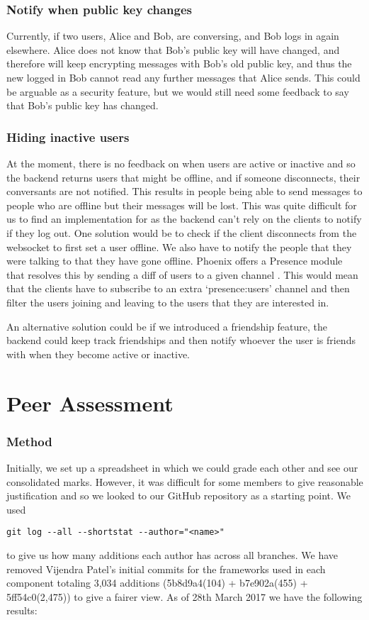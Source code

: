 \documentclass[11pt,a4paper]{report}
\begin{document}
\subsection{Notify when public key changes}
Currently, if two users, Alice and Bob, are conversing, and Bob logs in again elsewhere. Alice does not know that Bob's public key will have changed, and therefore will keep encrypting messages with Bob's old public key, and thus the new logged in Bob cannot read any further messages that Alice sends. This could be arguable as a security feature, but we would still need some feedback to say that Bob's public key has changed.

\subsection{Hiding inactive users}
At the moment, there is no feedback on when users are active or inactive and so the backend returns users that might be offline, and if someone disconnects, their conversants are not notified. This results in people being able to send messages to people who are offline but their messages will be lost. This was quite difficult for us to find an implementation for as the backend can't rely on the clients to notify if they log out. One solution would be to check if the client disconnects from the websocket to first set a user offline. We also have to notify the people that they were talking to that they have gone offline. Phoenix offers a Presence module that resolves this by sending a diff of users to a given channel \cite{website:elixir_phoenix_presence}. This would mean that the clients have to subscribe to an extra `presence:users' channel and then filter the users joining and leaving to the users that they are interested in.

An alternative solution could be if we introduced a friendship feature, the backend could keep track friendships and then notify whoever the user is friends with when they become active or inactive.

\chapter{Peer Assessment}

\subsection{Method}
Initially, we set up a spreadsheet in which we could grade each other and see our consolidated marks. However, it was difficult for some members to give reasonable justification and so we looked to our GitHub repository as a starting point. We used \begin{verbatim}git log --all --shortstat --author="<name>"\end{verbatim} to give us how many additions each author has across all branches. We have removed Vijendra Patel's initial commits for the frameworks used in each component totaling 3,034 additions (5b8d9a4(104) + b7e902a(455) + 5ff54c0(2,475)) to give a fairer view. As of 28th March 2017 we have the following results:
\end{document}
